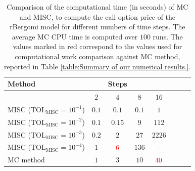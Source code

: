 \FloatBarrier
\begin{table}[h!]
	\centering
	\begin{tabular}{l*{6}{c}r}
	\toprule[1.5pt]
	Method & & Steps  & &     \\
	\hline	
		          & $2$ & $4$ & $8$ & $16$ &   \\
		\hline
		MISC ($\text{TOL}_{\text{MISC}}=10^{-1}$)  & $0.1$ & $0.1$ & $0.1$ & $1$ \\
		MISC ($\text{TOL}_{\text{MISC}}=10^{-2}$)  & $0.1$ & $0.15$ & $9$ & $112$ \\
		MISC ($\text{TOL}_{\text{MISC}}=10^{-3}$)  & $0.2$ & $2$ & $27$ & $2226$ \\
		MISC ($\text{TOL}_{\text{MISC}}=10^{-4}$)  & $1$ & $\red{6}$ & $136$ & $-$\\
%		
		\hline
		MC method   & $1
		
		$  & $ 3$  & $  10$ & $ \red{40}
		$  \\	
		\bottomrule[1.25pt]
%		
	\end{tabular}
	\caption{Comparison of the computational time (in seconds) of  MC and MISC,  to compute the call option price of the rBergomi model for different numbers of time steps. The average  MC CPU time is computed over $100$ runs. The values marked in red correspond to the values used for computational work comparison against MC method, reported in Table \ref{table:Summary of our numerical results.}. }
	\label{Comparsion of the computational time of  MC and MISC, used to compute Call option price of rBergomi model for different number of time steps. Case set4}
\end{table}


\FloatBarrier

